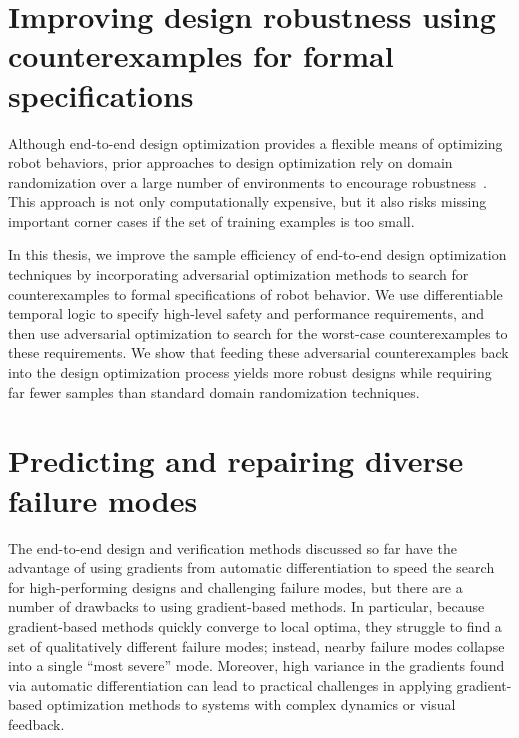 \section{Improving design robustness using counterexamples for formal specifications}

Although end-to-end design optimization provides a flexible means of optimizing robot behaviors, prior approaches to design optimization rely on domain randomization over a large number of environments to encourage robustness~\cite{tobinDomainRandomizationTransferring2017}. This approach is not only computationally expensive, but it also risks missing important corner cases if the set of training examples is too small.

In this thesis, we improve the sample efficiency of end-to-end design optimization techniques by incorporating adversarial optimization methods to search for counterexamples to formal specifications of robot behavior. We use differentiable temporal logic to specify high-level safety and performance requirements, and then use adversarial optimization to search for the worst-case counterexamples to these requirements. We show that feeding these adversarial counterexamples back into the design optimization process yields more robust designs while requiring far fewer samples than standard domain randomization techniques.

\section{Predicting and repairing diverse failure modes}

The end-to-end design and verification methods discussed so far have the advantage of using gradients from automatic differentiation to speed the search for high-performing designs and challenging failure modes, but there are a number of drawbacks to using gradient-based methods. In particular, because gradient-based methods quickly converge to local optima, they struggle to find a set of qualitatively different failure modes; instead, nearby failure modes collapse into a single ``most severe'' mode. Moreover, high variance in the gradients found via automatic differentiation can lead to practical challenges in applying gradient-based optimization methods to systems with complex dynamics or visual feedback.

